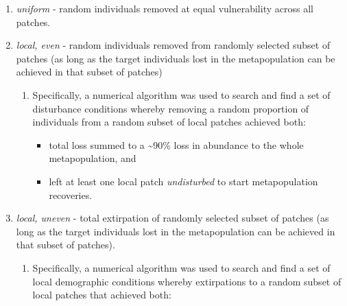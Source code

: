 \documentclass[
]{article}
\providecommand{\tightlist}{%
  \setlength{\itemsep}{0pt}\setlength{\parskip}{0pt}}
\begin{document}
\begin{enumerate}
  \begin{enumerate}
  \def\labelenumii{\alph{enumii}.}
  \tightlist
  \item
    \emph{uniform} - random individuals removed at equal vulnerability
    across all patches.
  \item
    \emph{local, even} - random individuals removed from randomly
    selected subset of patches (as long as the target individuals lost
    in the metapopulation can be achieved in that subset of patches)

    \begin{enumerate}
    \def\labelenumiii{\roman{enumiii}.}
    \tightlist
    \item
      Specifically, a numerical algorithm was used to search and find a
      set of disturbance conditions whereby removing a random proportion
      of individuals from a random subset of local patches achieved
      both:

      \begin{itemize}
      \tightlist
      \item
        total loss summed to a \textasciitilde90\% loss in abundance to
        the whole metapopulation, and
      \item
        left at least one local patch \emph{undisturbed} to start
        metapopulation recoveries.
      \end{itemize}
    \end{enumerate}
  \item
    \emph{local, uneven} - total extirpation of randomly selected subset
    of patches (as long as the target individuals lost in the
    metapopulation can be achieved in that subset of patches).

    \begin{enumerate}
    \def\labelenumiii{\roman{enumiii}.}
    \tightlist
    \item
      Specifically, a numerical algorithm was used to search and find a
      set of local demographic conditions whereby extirpations to a
      random subset of local patches that achieved both:


\end{enumerate}
\end{enumerate}
\end{enumerate}
\end{document}
